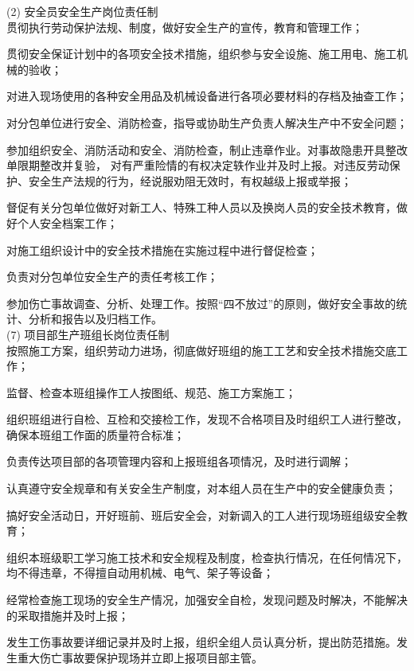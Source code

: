 (2) 安全员安全生产岗位责任制\\

 贯彻执行劳动保护法规、制度，做好安全生产的宣传，教育和管理工作；

 贯彻安全保证计划中的各项安全技术措施，组织参与安全设施、施工用电、施工机械的验收；

 对进入现场使用的各种安全用品及机械设备进行各项必要材料的存档及抽查工作；

 对分包单位进行安全、消防检查，指导或协助生产负责人解决生产中不安全问题；

 参加组织安全、消防活动和安全、消防检查，制止违章作业。对事故隐患开具整改单限期整改并复验，
对有严重险情的有权决定轶作业并及时上报。对违反劳动保护、安全生产法规的行为，经说服劝阻无效时，有权越级上报或举报；

 督促有关分包单位做好对新工人、特殊工种人员以及换岗人员的安全技术教育，做好个人安全档案工作；

 对施工组织设计中的安全技术措施在实施过程中进行督促检查；

 负责对分包单位安全生产的责任考核工作；

 参加伤亡事故调查、分析、处理工作。按照“四不放过”的原则，做好安全事故的统计、分析和报告以及归档工作。\\

(7) 项目部生产班组长岗位责任制\\

 按照施工方案，组织劳动力进场，彻底做好班组的施工工艺和安全技术措施交底工作；

 监督、检查本班组操作工人按图纸、规范、施工方案施工；

 组织班组进行自检、互检和交接检工作，发现不合格项目及时组织工人进行整改，确保本班组工作面的质量符合标准；

 负责传达项目部的各项管理内容和上报班组各项情况，及时进行调解；

 认真遵守安全规章和有关安全生产制度，对本组人员在生产中的安全健康负责；

 搞好安全活动日，开好班前、班后安全会，对新调入的工人进行现场班组级安全教育；

 组织本班级职工学习施工技术和安全规程及制度，检查执行情况，在任何情况下，均不得违章，不得擅自动用机械、电气、架子等设备；

 经常检查施工现场的安全生产情况，加强安全自检，发现问题及时解决，不能解决的采取措施并及时上报；

 发生工伤事故要详细记录并及时上报，组织全组人员认真分析，提出防范措施。发生重大伤亡事故要保护现场并立即上报项目部主管。\\

